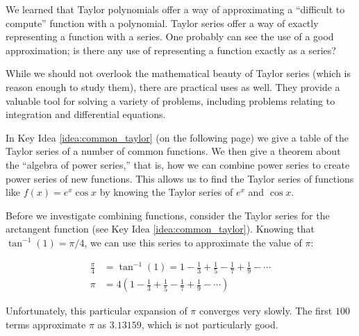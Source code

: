




%
We learned that Taylor polynomials offer a way of approximating a ``difficult to compute'' function with a polynomial. Taylor series offer a way of exactly representing a function with a series. One probably can see the use of a good approximation; is there any use of representing a function exactly as a series? 

While we should not overlook the mathematical beauty of Taylor series (which is reason enough to study them), there are practical uses as well. They provide a valuable tool for solving a variety of problems, including problems relating to integration and differential equations. 

In Key Idea \ref{idea:common_taylor} (on the following page) we give  a table of the Taylor series of a number of common functions. We then give a theorem about the ``algebra of power series,'' that is, how we can combine power series to create power series of new functions. This allows us to find the Taylor series of functions like $f(x) = e^x\cos x$ by knowing the Taylor series of $e^x$ and $\cos x$.

Before we investigate combining functions, consider the Taylor series for the arctangent function (see Key Idea \ref{idea:common_taylor}). Knowing that $\tan^{-1}(1) = \pi/4$, we can use this series to approximate the value of $\pi$:

\begin{align*}
\frac{\pi}4 &= \tan^{-1}(1) = 1-\frac13+\frac15-\frac17+\frac19-\cdots\\
\pi &= 4\left(1-\frac13+\frac15-\frac17+\frac19-\cdots\right)
\end{align*} 

Unfortunately, this particular expansion of $\pi$ converges very slowly. The first 
$ 100 $ terms approximate $\pi$ as $3.13159$, which is not particularly good.
\clearpage


